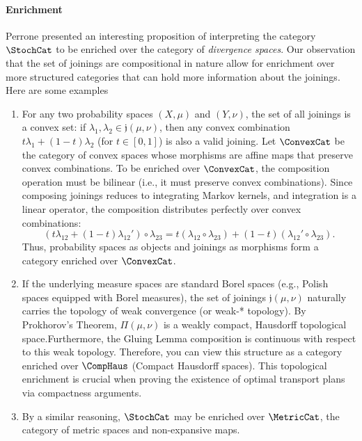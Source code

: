 \documentclass[12pt,oneside,pb-diagram]{article}
\newcommand{\join}{\mathfrak{j}}
\begin{document}
\paragraph{Enrichment} Perrone \cite{Perrone2024entropy} presented an interesting proposition of interpreting the category $\StochCat$ to be enriched over the category of \emph{divergence spaces}. Our observation that the set of joinings are compositional in nature allow for enrichment over more structured categories that can hold more information about the joinings. Here are some examples
\begin{enumerate}
	\item For any two probability spaces $(X, \mu)$ and $(Y, \nu)$, the set of all joinings is a convex set: if $\lambda_1, \lambda_2 \in \join(\mu, \nu)$, then any convex combination $t\lambda_1 + (1-t)\lambda_2$ (for $t \in [0, 1]$) is also a valid joining. Let $\ConvexCat$ be the category of convex spaces whose morphisms are affine maps that preserve convex combinations. To be enriched over $\ConvexCat$, the composition operation must be bilinear (i.e., it must preserve convex combinations). Since composing joinings reduces to integrating Markov kernels, and integration is a linear operator, the composition distributes perfectly over convex combinations:
	\[ (t\lambda_{12} + (1-t)\lambda_{12}') \circ \lambda_{23} = t(\lambda_{12} \circ \lambda_{23}) + (1-t)(\lambda_{12}' \circ \lambda_{23}) .\]
	Thus, probability spaces as objects and joinings as morphisms form a category enriched over $\ConvexCat$.
	\item If the underlying measure spaces are standard Borel spaces (e.g., Polish spaces equipped with Borel measures), the set of joinings $\join(\mu, \nu)$ naturally carries the topology of weak convergence (or weak-* topology). By Prokhorov's Theorem, $\Pi(\mu, \nu)$ is a weakly compact, Hausdorff topological space.Furthermore, the Gluing Lemma composition is continuous with respect to this weak topology. Therefore, you can view this structure as a category enriched over $\CompHaus$ (Compact Hausdorff spaces). This topological enrichment is crucial when proving the existence of optimal transport plans via compactness arguments.
	\item By a similar reasoning, $\StochCat$ may be enriched over $\MetricCat$, the category of metric spaces and non-expansive maps.
\end{enumerate}
\end{document}

